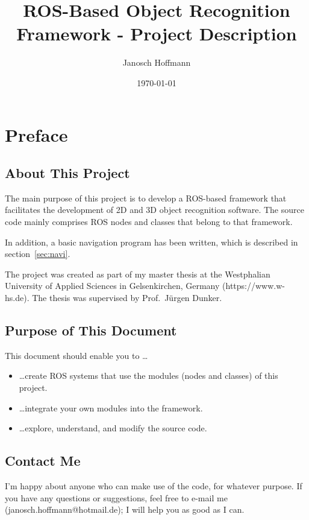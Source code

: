 \documentclass{article}
\title{ROS-Based Object Recognition Framework - Project Description}
\author{Janosch Hoffmann}
\date{\today}
\begin{document}
\maketitle

\tableofcontents


\section{Preface}

\subsection{About This Project}

The main purpose of this project is to develop a ROS-based
framework that facilitates the development of 2D and 3D object
recognition software.
The source code mainly comprises ROS nodes and classes that
belong to that framework.

In addition, a basic navigation program has been written,
which is described in section~\ref{sec:navi}.

The project was created as part of my master
thesis at the Westphalian University of Applied Sciences in
Gelsenkirchen, Germany (https://www.w-hs.de).
The thesis was supervised by Prof.\ J\"{u}rgen Dunker.



\subsection{Purpose of This Document}
This document should enable you to \ldots
\begin{itemize}
	\item \ldots create ROS systems that use the modules (nodes and classes)
		of this project.
	\item \ldots integrate your own modules into the framework.
	\item \ldots explore, understand, and modify the source code.
\end{itemize}


\subsection{Contact Me}

I'm happy about anyone who can make use of the code, for whatever purpose.
If you have any questions or suggestions, feel free to e-mail me
(janosch.hoffmann@hotmail.de); I will help you as good as I can.
\end{document}
